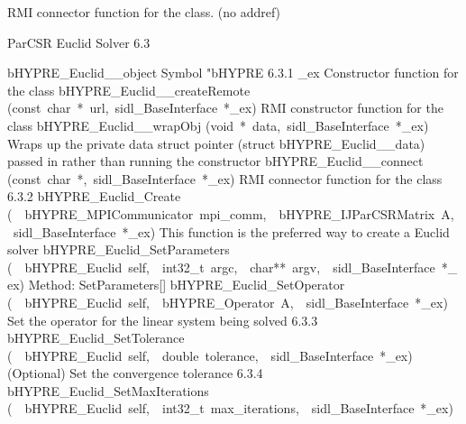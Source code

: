 \documentclass{article}
\begin{document}
\begin{cxxentry}
\begin{cxxentry}
\begin{cxxvariable}
\begin{cxxdoc}
RMI connector function for the class. (no addref)
\end{cxxdoc}
\end{cxxvariable}
\end{cxxentry}
\begin{cxxentry}
{}
        {ParCSR Euclid Solver}
        {}
        {
}
        {6.3}
\begin{cxxnames}
        {bHYPRE\_Euclid\_\_object}
        {}
        {
Symbol "bHYPRE}
        {6.3.1}
        {\_ex}
        {}
        {
Constructor function for the class}
        {}
\label{cxx.6.3.11}
        {bHYPRE\_Euclid\_\_createRemote}
        {(const\ char\ *\ url,\ sidl\_BaseInterface\ *\_ex)}
        {
RMI constructor function for the class}
        {}
\label{cxx.6.3.12}
        {bHYPRE\_Euclid\_\_wrapObj}
        {(void\ *\ data,\ sidl\_BaseInterface\ *\_ex)}
        {
Wraps up the private data struct pointer (struct bHYPRE\_Euclid\_\_data) passed in rather than running the constructor}
        {}
\label{cxx.6.3.13}
        {bHYPRE\_Euclid\_\_connect}
        {(const\ char\ *,\ sidl\_BaseInterface\ *\_ex)}
        {
RMI connector function for the class}
        {6.3.2}
        {bHYPRE\_Euclid\_Create}
        {(\ \ bHYPRE\_MPICommunicator\ mpi\_comm,\ \ bHYPRE\_IJParCSRMatrix\ A,\ \ sidl\_BaseInterface\ *\_ex)}
        {
This function is the preferred way to create a Euclid solver}
        {}
\label{cxx.6.3.14}
        {bHYPRE\_Euclid\_SetParameters}
        {(\ \ bHYPRE\_Euclid\ self,\ \ int32\_t\ argc,\ \ char**\ argv,\ \ sidl\_BaseInterface\ *\_ex)}
        {
Method:  SetParameters[]}
        {}
\label{cxx.6.3.15}
        {bHYPRE\_Euclid\_SetOperator}
        {(\ \ bHYPRE\_Euclid\ self,\ \ bHYPRE\_Operator\ A,\ \ sidl\_BaseInterface\ *\_ex)}
        {
Set the operator for the linear system being solved}
        {6.3.3}
        {bHYPRE\_Euclid\_SetTolerance}
        {(\ \ bHYPRE\_Euclid\ self,\ \ double\ tolerance,\ \ sidl\_BaseInterface\ *\_ex)}
        {
(Optional) Set the convergence tolerance}
        {6.3.4}
        {bHYPRE\_Euclid\_SetMaxIterations}
        {(\ \ bHYPRE\_Euclid\ self,\ \ int32\_t\ max\_iterations,\ \ sidl\_BaseInterface\ *\_ex)}

\end{cxxnames}
\end{cxxentry}
\end{cxxentry}
\end{document}
